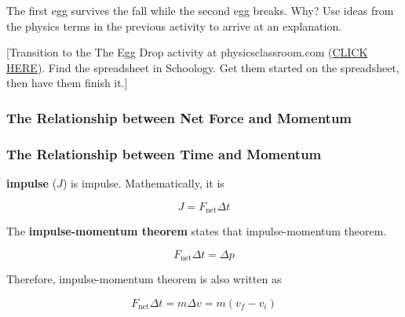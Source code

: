 \documentclass[dvipsnames]{article}
\begin{document}
\begin{center}
\hspace{2cm}
\end{center}

The first egg survives the fall while the second egg breaks. Why? Use ideas from the physics terms in the previous activity to arrive at an explanation.

[Transition to the The Egg Drop activity at physicsclassroom.com (\href{https://www.physicsclassroom.com/physics-interactives/momentum-and-collisions/egg-drop/egg-drop-interactive}{CLICK HERE}). Find the spreadsheet in Schoology. Get them started on the spreadsheet, then have them finish it.]



\subsubsection{The Relationship between Net Force and Momentum}

\subsubsection{The Relationship between Time and Momentum}

\textbf{\Gls{impulse}} ($J$) is \glsdesc{impulse}. Mathematically, it is 

\begin{equation*}
    J = F_\text{net} \Delta t
\end{equation*}

The \textbf{\gls{impulse-momentum theorem}} states that \glsdesc{impulse-momentum theorem}.

\begin{equation*}
    F_\text{net} \Delta t = \Delta p
\end{equation*}

Therefore, impulse-momentum theorem is also written as

\begin{equation*}
    F_\text{net} \Delta t = m \Delta v = m(v_f - v_i)
\end{equation*}
\end{document}
